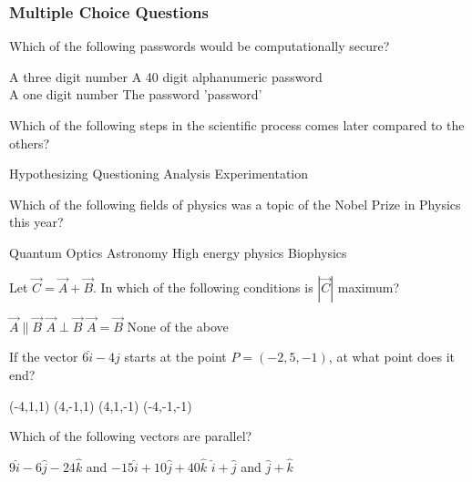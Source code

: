 \documentclass[12pt,addpoints]{exam}
\begin{document}
{{{				\subsubsection*{Multiple Choice Questions}
				\begin{questions}
					\question Which of the following passwords would be computationally secure?\\
					\begin{oneparchoices}
						\choice A three digit number
						\choice A 40 digit alphanumeric password \\
						\choice A one digit number
						\choice The password 'password'
					\end{oneparchoices}
					\question Which of the following steps in the scientific process comes later compared to the others? \\
					\begin{oneparchoices}
						\choice Hypothesizing
						\choice Questioning
						\choice Analysis
						\choice Experimentation
					\end{oneparchoices}
					\question Which of the following fields of physics was a topic of the Nobel Prize in Physics this year? \\
					\begin{oneparchoices}
						\choice Quantum Optics
						\choice Astronomy
						\choice High energy physics
						\choice Biophysics
					\end{oneparchoices}
					\question Let $\vec{C}=\vec{A}+\vec{B}$. In which of the following conditions is $|\vec{C}|$ maximum? \\
					\begin{oneparchoices}
						\choice $\vec{A}\parallel\vec{B}$
						\choice $\vec{A}\perp\vec{B}$
						\choice $\vec{A}=\vec{B}$
						\choice None of the above
					\end{oneparchoices}
					\question If the vector $6\hat{i}-4\hat{j}$ starts at the point $P =(-2,5,-1)$, at what point does it end? \\
					\begin{oneparchoices}
						\choice (-4,1,1)
						\choice (4,-1,1)
						\choice (4,1,-1)
						\choice (-4,-1,-1)
					\end{oneparchoices}
					\question Which of the following vectors are parallel? \\
					\begin{oneparchoices}
						\choice $9\hat i - 6\hat j - 24\hat k$ and $-15\hat i+ 10\hat j+ 40\hat k$
						\choice $\hat i + \hat j$ and $\hat j+ \hat k$ \\

\end{oneparchoices}
\end{questions}}}}
\end{document}
